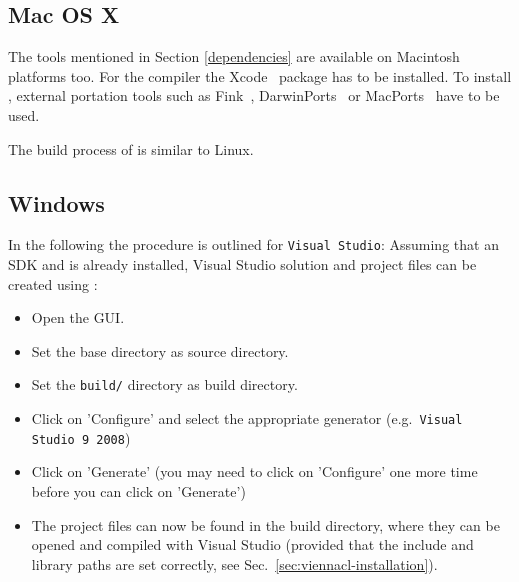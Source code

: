 
\subsection{Mac OS X}
\label{apple}
The tools mentioned in Section \ref{dependencies} are available on 
Macintosh platforms too. 
For the {\GCC} compiler the Xcode~\cite{xcode} package has to be installed.
To install {\CMake}, external portation tools such as
Fink~\cite{fink}, DarwinPorts~\cite{darwinports} 
or MacPorts~\cite{macports} have to be used. 

The build process of {\ViennaData} is similar to Linux.

\subsection{Windows}
In the following the procedure is outlined for \texttt{Visual Studio}: Assuming
that an {\OpenCL} SDK and {\CMake} is already installed, Visual Studio solution
and project files can be created using {\CMake}:
\begin{itemize}
\item Open the {\CMake} GUI.
\item Set the {\ViennaData} base directory as source directory.
\item Set the \texttt{build/} directory as build directory.
\item Click on 'Configure' and select the appropriate generator
(e.g.~\texttt{Visual Studio 9 2008})
\item Click on 'Generate' (you may need to click on 'Configure' one more time
before you can click on 'Generate')
\item The project files can now be found in the {\ViennaData} build directory,
where they can be opened and compiled with Visual Studio (provided that the
include and library paths are set correctly, see
Sec.~\ref{sec:viennacl-installation}).
\end{itemize}

























